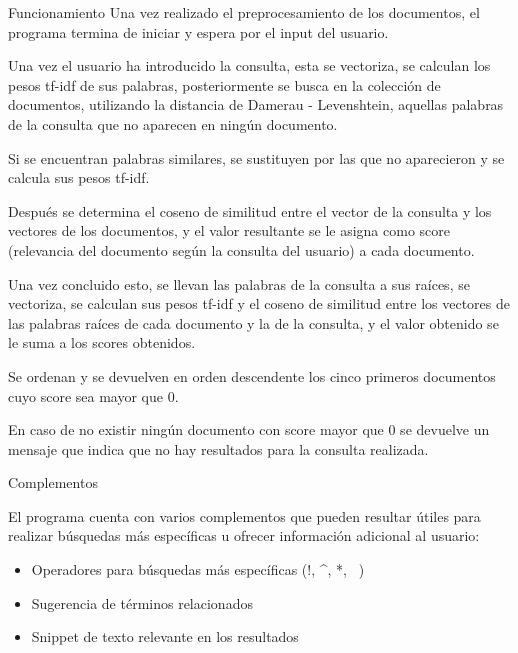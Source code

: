 \documentclass{beamer}
\begin{document}
\begin{frame}{Funcionamiento}
Una vez realizado el preprocesamiento de los documentos, el programa termina de iniciar y espera por el input del usuario.

\bigskip

Una vez el usuario ha introducido la consulta, esta se vectoriza, se calculan los pesos tf-idf de sus palabras, posteriormente se busca en la colección de documentos, utilizando la distancia de Damerau - Levenshtein, aquellas palabras de la consulta que no aparecen en ningún documento.

\bigskip

Si se encuentran palabras similares, se sustituyen por las que no aparecieron y se calcula sus pesos tf-idf.

\bigskip

Después se determina el coseno de similitud entre el vector de la consulta y los vectores de los documentos, y el valor resultante se le asigna como score (relevancia del documento según la consulta del usuario) a cada documento.

\bigskip

Una vez concluido esto, se llevan las palabras de la consulta a sus raíces, se vectoriza, se calculan sus pesos tf-idf y el coseno de similitud entre los vectores de las palabras raíces de cada documento y la de la consulta, y el valor obtenido se le suma a los scores obtenidos.

\bigskip

Se ordenan y se devuelven en orden descendente los cinco primeros documentos cuyo score sea mayor que 0.

\bigskip

En caso de no existir ningún documento con score mayor que 0 se devuelve un mensaje que indica que no hay resultados para la consulta realizada.
\end{frame}

\begin{frame}{Complementos}

El programa cuenta con varios complementos que pueden resultar útiles para realizar búsquedas más específicas u ofrecer información adicional al usuario:

\begin{itemize}
\item Operadores para búsquedas más específicas (!, \^{}, *, ~)
\item Sugerencia de términos relacionados
\item Snippet de texto relevante en los resultados
\end{itemize}

\end{frame}
\end{document}

